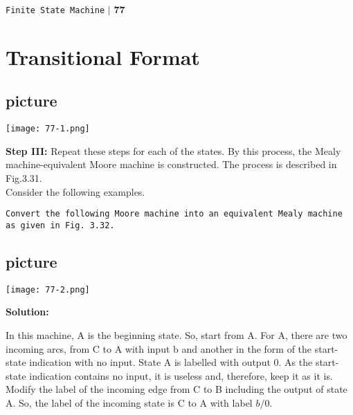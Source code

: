 \documentclass[9pt]{beamer}
\begin{document}
\begin{frame}

\begin{flushright}
 \texttt{Finite State Machine} \hspace*{0.10cm}\textbf{$|$} \textbf{77}\hspace*{0.5cm}
\end{flushright}

\section*{Transitional Format}

\vspace*{1cm}
\begin{center}
\section{picture}
\texttt{[image: 77-1.png]}
\end{center}

\vspace*{0.5cm}
\textbf{Step III:} Repeat these steps for each of the states. By this process, the Mealy machine-equivalent Moore
machine is constructed. The process is described in Fig.3.31.\\
\hspace*{0.2cm} Consider the following examples.
\end{frame}

\begin{frame}
\hspace*{0.1cm} \texttt{\small{Convert the following Moore machine into an equivalent Mealy machine as given in Fig. 3.32.}}
\begin{center}
\section{picture}
\texttt{[image: 77-2.png]}
\end{center}

\pause
\textbf{Solution:}

\small{In this machine, A is the beginning state. So, start from
A. For A, there are two incoming arcs, from C to A
with input b and another in the form of the start-state
indication with no input. State A is labelled with output
$0$. As the start-state indication contains no input, it is
useless and, therefore, keep it as it is.\\
\hspace*{0.2cm} Modify the label of the incoming edge from C to
B including the output of state A. So, the label of the
incoming state is C to A with label $b/0$.}

\end{frame}
\end{document}
